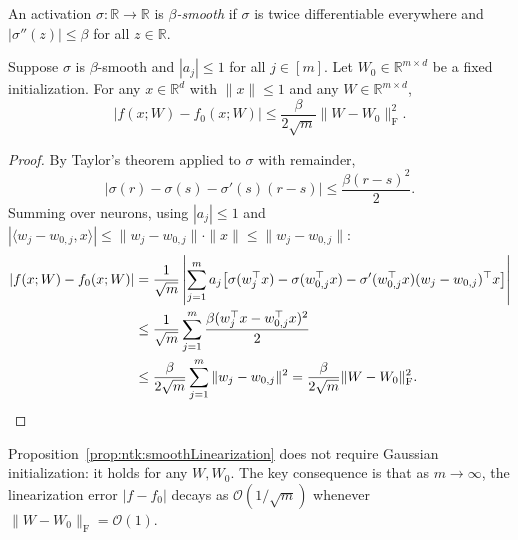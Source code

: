 \begin{definition}\label{def:ntk:betaSmooth}
  \leanok
An activation $\sigma : \mathbb{R} \to \mathbb{R}$ is \emph{$\beta$-smooth} if $\sigma$ is
twice differentiable everywhere and $|\sigma''(z)| \le \beta$ for all $z \in \mathbb{R}$.
\end{definition}

\begin{proposition}\label{prop:ntk:smoothLinearization}
  \leanok
Suppose $\sigma$ is $\beta$-smooth and $|a_j| \le 1$ for all $j \in [m]$.
Let $W_0 \in \mathbb{R}^{m \times d}$ be a fixed initialization.
For any $x \in \mathbb{R}^d$ with $\|x\| \le 1$ and any $W \in \mathbb{R}^{m \times d}$,
\[
  |f(x; W) - f_0(x; W)| \le \frac{\beta}{2\sqrt{m}} \|W - W_0\|_{\mathrm{F}}^2.
\]
\end{proposition}

\begin{proof}
  \leanok
By Taylor's theorem applied to $\sigma$ with remainder,
\[
  |\sigma(r) - \sigma(s) - \sigma'(s)(r-s)| \le \frac{\beta(r-s)^2}{2}.
\]
Summing over neurons, using $|a_j| \le 1$ and $|\langle w_j - w_{0,j}, x\rangle| \le \|w_j - w_{0,j}\| \cdot \|x\| \le \|w_j - w_{0,j}\|$:
\begin{align*}
  |f(x;W) - f_0(x;W)|
  &= \frac{1}{\sqrt{m}}\left|\sum_{j=1}^m a_j
      \bigl[\sigma(w_j^\top x) - \sigma(w_{0,j}^\top x) - \sigma'(w_{0,j}^\top x)(w_j-w_{0,j})^\top x\bigr]
     \right| \\
  &\le \frac{1}{\sqrt{m}} \sum_{j=1}^m \frac{\beta(w_j^\top x - w_{0,j}^\top x)^2}{2} \\
  &\le \frac{\beta}{2\sqrt{m}} \sum_{j=1}^m \|w_j - w_{0,j}\|^2
   = \frac{\beta}{2\sqrt{m}} \|W - W_0\|_{\mathrm{F}}^2. \qedhere
\end{align*}
\end{proof}

\begin{remark}
Proposition~\ref{prop:ntk:smoothLinearization} does not require Gaussian initialization:
it holds for any $W, W_0$.
The key consequence is that as $m \to \infty$, the linearization error $|f - f_0|$ decays
as $\mathcal{O}(1/\sqrt{m})$ whenever $\|W - W_0\|_{\mathrm{F}} = \mathcal{O}(1)$.
\end{remark}

